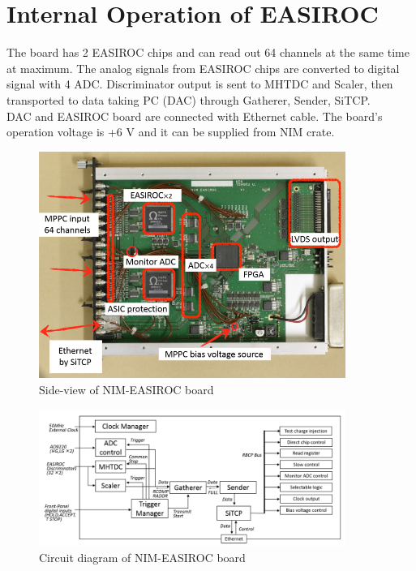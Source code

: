 
\section{Internal Operation of EASIROC}
The board has 2 EASIROC chips and can read out 64 channels at the same time at maximum.
The analog signals from EASIROC chips are converted to digital signal with 4 ADC. Discriminator output is sent to MHTDC and Scaler, then transported to data taking PC (DAC) through Gatherer, Sender, SiTCP.\\
DAC and EASIROC board are connected with Ethernet cable.
The board's operation voltage is +6 V and it can be supplied from NIM crate.

\begin{figure}[H]
\begin{center}
\includegraphics[width = 10.0cm, bb= 0 0 735 544]{2.png}
\end{center}
\caption{Side-view of NIM-EASIROC board}
\label{fig:}
\end{figure}

\begin{figure}[H]
\begin{center}
\includegraphics[width = 10.0cm, bb= 0 0 952 424]{3.png}
\end{center}
\caption{Circuit diagram of NIM-EASIROC board}
\label{fig:}
\end{figure}

